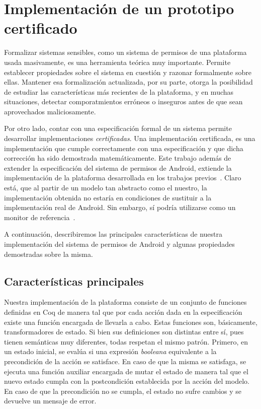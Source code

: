 \chapter{Implementación de un prototipo certificado}
\label{chapter:implementation}
Formalizar sistemas sensibles, como un sistema de permisos de una plataforma usada masivamente, es
una herramienta teórica muy importante. Permite establecer propiedades sobre el sistema en cuestión
y razonar formalmente sobre ellas. Mantener esa formalización actualizada, por su parte, otorga la
posibilidad de estudiar las características más recientes de la plataforma, y en muchas situaciones,
detectar comporatmientos erróneos o inseguros antes de que sean aprovechados maliciosamente.

Por otro lado, contar con una especificación formal de un sistema permite desarrollar
implementaciones \textit{certificadas}. Una implementación certificada, es una implementación que
cumple correctamente con una especificación y que dicha corrección ha sido demostrada
matemáticamente. Este trabajo además de extender la especificación del sistema de permisos de
Android, extiende la implementación de la plataforma desarrollada en los trabajos previos~\cite{betarte-2017,luna-cleiej}. Claro está, que al partir de un modelo tan abstracto como el
nuestro, la implementación obtenida no estaría en condiciones de sustituir a la implementación real
de Android. Sin embargo, sí podría utilizarse como un monitor de referencia~\cite{Anderson:1972}.

A continuación, describiremos las principales características de nuestra implementación del sistema
de permisos de Android y algunas propiedades demostradas sobre la misma.

\section{Características principales}
Nuestra implementación de la plataforma consiste de un conjunto de funciones definidas en Coq de
manera tal que por cada acción dada en la especificación existe una función encargada de llevarla a
cabo. Estas funciones son, básicamente, transformadores de estado. Si bien sus definiciones son
distintas entre sí, pues tienen semánticas muy diferentes, todas respetan el mismo patrón. Primero,
en un estado inicial, se evalúa si una expresión \textit{booleana} equivalente a la precondición de
la acción se satisface. En caso de que la misma se satisfaga, se ejecuta una función auxiliar
encargada de mutar el estado de manera tal que el nuevo estado cumpla con la postcondición
establecida por la acción del modelo. En caso de que la precondición no se cumpla, el estado no
sufre cambios y se devuelve un mensaje de error.

